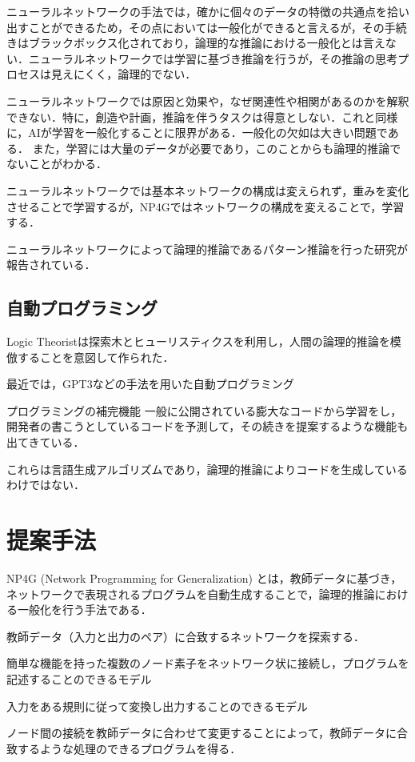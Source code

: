 \documentclass[exploratorypaper]{jsaiart} %
\begin{document}
ニューラルネットワークの手法では，確かに個々のデータの特徴の共通点を拾い出すことができるため，その点においては一般化ができると言えるが，その手続きはブラックボックス化されており，論理的な推論における一般化とは言えない．ニューラルネットワークでは学習に基づき推論を行うが，その推論の思考プロセスは見えにくく，論理的でない．

ニューラルネットワークでは原因と効果や，なぜ関連性や相関があるのかを解釈できない．特に，創造や計画，推論を伴うタスクは得意としない．これと同様に，AIが学習を一般化することに限界がある．一般化の欠如は大きい問題である．
また，学習には大量のデータが必要であり，このことからも論理的推論でないことがわかる．

ニューラルネットワークでは基本ネットワークの構成は変えられず，重みを変化させることで学習するが，NP4Gではネットワークの構成を変えることで，学習する．

ニューラルネットワークによって論理的推論であるパターン推論を行った研究が報告されている\cite{tsukimoto:00}\cite{sudo:07}．


\subsection{自動プログラミング}
Logic Theorist\cite{LogicTheorist}は探索木とヒューリスティクスを利用し，人間の論理的推論を模倣することを意図して作られた．

最近では，GPT3\cite{gpt3}などの手法を用いた自動プログラミング

プログラミングの補完機能
一般に公開されている膨大なコードから学習をし，開発者の書こうとしているコードを予測して，その続きを提案するような機能も出てきている\cite{copilot}．

これらは言語生成アルゴリズムであり，論理的推論によりコードを生成しているわけではない．

\section{提案手法}
NP4G (Network Programming for Generalization) とは，教師データに基づき，ネットワークで表現されるプログラムを自動生成することで，論理的推論における一般化を行う手法である．

教師データ（入力と出力のペア）に合致するネットワークを探索する．

簡単な機能を持った複数のノード素子をネットワーク状に接続し，プログラムを記述することのできるモデル

入力をある規則に従って変換し出力することのできるモデル

ノード間の接続を教師データに合わせて変更することによって，教師データに合致するような処理のできるプログラムを得る．
\end{document}
